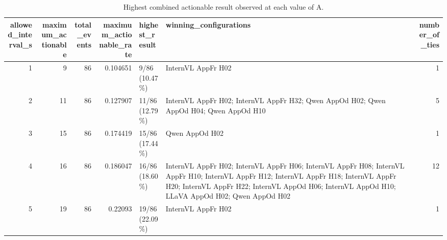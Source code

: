 \begin{table}[tbp]
\caption{Highest combined actionable result observed at each value of A.}
\label{tab:rq4-overall-effect-of-a}
\begin{tabular}{rrrrllr}
\toprule
allowed\_interval\_s & maximum\_actionable & total\_events & maximum\_actionable\_rate & highest\_result & winning\_configurations & number\_of\_ties \\
\midrule
1 & 9 & 86 & 0.104651 & 9/86 (10.47\%) & InternVL AppFr H02 & 1 \\
2 & 11 & 86 & 0.127907 & 11/86 (12.79\%) & InternVL AppFr H02; InternVL AppFr H32; Qwen AppOd H02; Qwen AppOd H04; Qwen AppOd H10 & 5 \\
3 & 15 & 86 & 0.174419 & 15/86 (17.44\%) & Qwen AppOd H02 & 1 \\
4 & 16 & 86 & 0.186047 & 16/86 (18.60\%) & InternVL AppFr H02; InternVL AppFr H06; InternVL AppFr H08; InternVL AppFr H10; InternVL AppFr H12; InternVL AppFr H18; InternVL AppFr H20; InternVL AppFr H22; InternVL AppOd H06; InternVL AppOd H10; LLaVA AppOd H02; Qwen AppOd H02 & 12 \\
5 & 19 & 86 & 0.22093 & 19/86 (22.09\%) & InternVL AppFr H02 & 1 \\
\bottomrule
\end{tabular}
\end{table}

